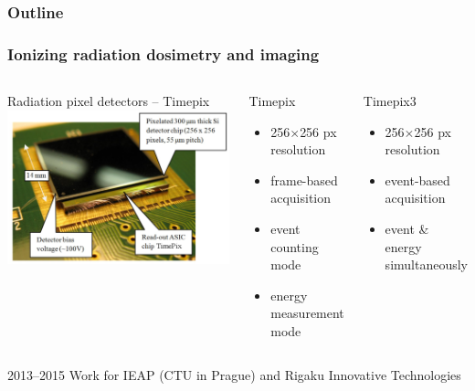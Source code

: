 \documentclass[aspectratio=169]{beamer}
\begin{document}
\begin{frame}
  \frametitle{Outline}
  \tableofcontents[currentsection]
\end{frame}



\begin{frame}
\frametitle{Ionizing radiation dosimetry and imaging}

  \begin{columns}[c]

  \begin{block}{Radiation pixel detectors -- Timepix}
    \includegraphics[width=1.0\textwidth]{./fig/timepix.jpg}
  \end{block}

  \begin{block}{Timepix}
    \begin{itemize}
      \item 256$\times$256 px resolution
      \item frame-based acquisition
      \item event counting mode
      \item energy measurement mode
    \end{itemize}
  \end{block}

  \begin{block}{Timepix3}
    \begin{itemize}
      \item 256$\times$256 px resolution
      \item event-based acquisition
      \item event \& energy simultaneously
    \end{itemize}
  \end{block}

  \end{columns}

  \begin{block}{2013--2015}
    Work for IEAP (CTU in Prague) and Rigaku Innovative Technologies
  \end{block}

\end{frame}
\end{document}
